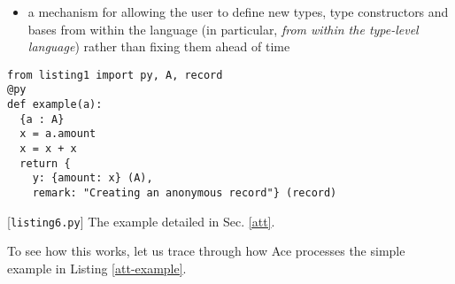 \documentclass[10pt,preprint]{sigplanconf}
\begin{document}
{\begin{itemize}
\begin{itemize}
  \item a type or type constructor extracted from a subterm
  \item a per-function base semantics (or simply \emph{base}) for forms for which this is not possible  (variables, literals without ascriptions and most statements)
  \end{itemize}
\item a mechanism for allowing the user to define new types, type constructors and bases from within the language (in particular, \emph{from within the type-level language}) rather than fixing them ahead of time
\end{itemize}
\begin{codelisting}
\begin{lstlisting}
from listing1 import py, A, record
@py
def example(a):
  {a : A}
  x = a.amount
  x = x + x
  return {
    y: {amount: x} (A),
    remark: "Creating an anonymous record"} (record)
\end{lstlisting}
\caption{[\texttt{listing6.py}] The example detailed in Sec. \ref{att}.}
\label{att-example}
\end{codelisting}

To see how this works, let us trace through how Ace processes the simple example in Listing \ref{att-example}. 

}
\end{document}
